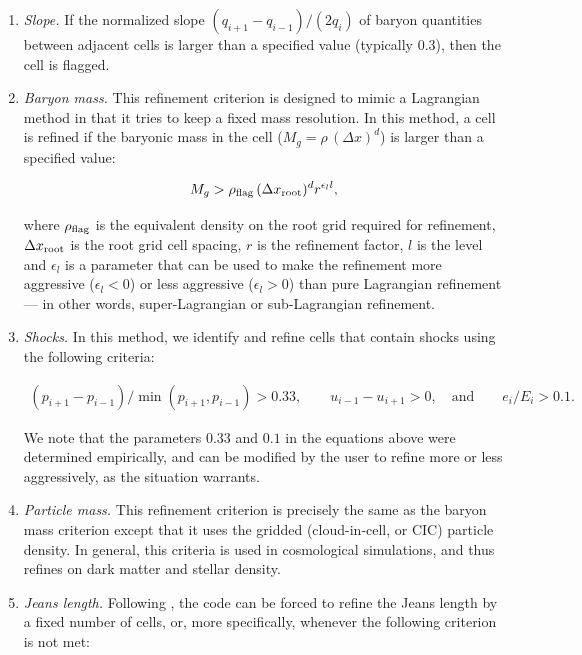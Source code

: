 \begin{enumerate}

\item{\em Slope.}  If the normalized slope $(q_{i+1} - q_{i-1})/ (2
  q_i)$ of baryon quantities between adjacent cells is larger than a
  specified value (typically 0.3), then the cell is flagged.

\item{\em Baryon mass.}  This refinement criterion is designed to
  mimic a Lagrangian method in that it tries to keep a fixed mass
  resolution.  In this method, a cell is refined if the baryonic mass
  in the cell ($M_g = \rho\, (\Delta x)^d$) is larger than a specified value:

\begin{equation}
M_g > \rho_{\rm flag}\, (\Delta x_{\rm root})^d r^{\epsilon_l l},
\end{equation}

where $\rho_{\rm flag}$ is the equivalent density on the root grid
required for refinement, $\Delta x_{\rm root}$ is the root grid cell
spacing, $r$ is the refinement factor, $l$ is the level and
$\epsilon_l$ is a parameter that can be used to make the refinement
more aggressive ($\epsilon_l < 0$) or less aggressive ($\epsilon_l >
0$) than pure Lagrangian refinement --- in other words,
super-Lagrangian or sub-Lagrangian refinement.

\item{\em Shocks.}  In this method, we identify and refine cells that
  contain shocks using the following criteria:

\begin{eqnarray}
(p_{i+1} - p_{i-1})/\min(p_{i+1}, p_{i-1}) > 0.33,  \qquad
u_{i-1} - u_{i+1} > 0, \quad\text{and} \qquad
e_i / E_i > 0.1.  \nonumber
\end{eqnarray}

We note that the parameters $0.33$ and $0.1$ in the equations above
were determined empirically, and can be modified by the user to refine
more or less aggressively, as the situation warrants.

\item{\em Particle mass.}  This refinement criterion is precisely the
  same as the baryon mass criterion except that it uses the gridded
  (cloud-in-cell, or CIC) particle density.  In general, this criteria
  is used in cosmological simulations, and thus refines on dark matter
  and stellar density.


\item{\em Jeans length.}  Following \cite{Truelove98}, the code can be
  forced to refine the Jeans length by a fixed number of cells, or,
  more specifically, whenever the following criterion is not met:


\end{enumerate}
